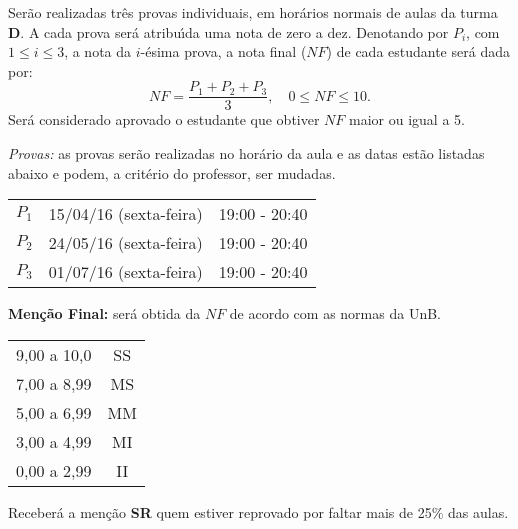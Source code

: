 \documentclass[12pt]{article}
\begin{document}
 Ser\~ao realizadas tr\^es provas individuais, em hor\'arios normais de aulas da turma \textbf{D}. A cada prova ser\'a atribu{\'\i}da uma nota de zero a dez. Denotando por $P_i$, com $1 \le i \le 3$, a nota da $i$-\'esima prova, a nota final ($NF$) de cada estudante ser\'a dada por:
\[
    NF = \dfrac{P_1 + P_2 + P_3}{3}, \quad 0 \le NF \le 10.
\]
Ser\'a considerado aprovado o estudante que obtiver $NF$ maior ou igual a 5.

\vspace{0.5cm}

\noindent\textit{Provas:} as provas ser\~ao realizadas no hor\'ario da aula e as datas est\~ao listadas abaixo e podem, a crit\'erio do professor, ser mudadas.

\begin{center}
    \begin{tabular}{c|c|c}
        \hline\hline
        \hspace{1cm}{\bf Prova}\hspace{1cm} & \hspace{3cm}{\bf Data}\hspace{3cm} & \hspace{1.7cm}{\bf Hor\'{a}rio}\hspace{1.7cm} \\
        \hline\hline
        $P_1$ & 15/04/16 (sexta-feira) \phantom{x} & 19:00 - 20:40 \\
        \hline
        $P_2$ & 24/05/16 (sexta-feira) \phantom{x} & 19:00 - 20:40 \\
        \hline
        $P_3$ & 01/07/16 (sexta-feira) \phantom{x} & 19:00 - 20:40 \\
        \hline\hline
    \end{tabular}
\end{center}

\vspace{0.5cm}
{\bf \noindent Men\c{c}\~{a}o Final:} ser\'{a} obtida da $NF$ de
acordo com as normas da UnB.
\begin{center}
    \begin{tabular}{c|c}
        \hline\hline
        \hspace{1cm}{Nota}\hspace{1cm} & \hspace{0.25cm}{Men\c{c}\~{a}o}\hspace{0.25cm}\\
        \hline\hline
        9,00 a 10,0 & SS \\
        \hline
        7,00 a 8,99 & MS \\
        \hline
        5,00 a 6,99 & MM \\
        \hline
        3,00 a 4,99 & MI \\
        \hline
        0,00 a 2,99  & II \\
        \hline\hline
    \end{tabular}
\end{center}
Receber{\'a} a men{\c c}{\~a}o {\bf SR} quem estiver reprovado por faltar mais de 25\%
das aulas.
\end{document}
